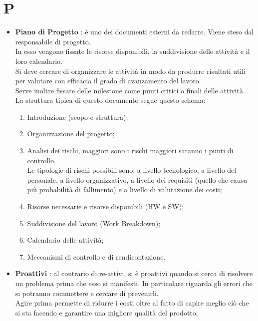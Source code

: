 % 
%
% 
%

\section{P}

\begin{itemize}
	\item \textbf{Piano di Progetto} : è uno dei documenti esterni da redarre. Viene steso dal responsabile di progetto. \\
In esso vengono fissate le risorse disponibili, la suddivisione delle attività e il loro calendario. \\
Si deve cercare di organizzare le attività in modo da produrre risultati utili per valutare con efficacia il grado di avanzamento del lavoro. \\
Serve inoltre fissare delle milestone come punti critici o finali delle attività. \\
La struttura tipica di questo documento segue questo schema:
	\begin{enumerate}
		\item Introduzione (scopo e struttura);
		\item Organizzazione del progetto;
		\item Analisi dei rischi, maggiori sono i rischi maggiori saranno i punti di controllo. \\
Le tipologie di rischi possibili sono: a livello tecnologico, a livello del personale, a livello organizzativo, a livello dei requisiti (quello che causa più probabilità di fallimento) e a livello di valutazione dei costi;
		\item Risorse necessarie e risorse disponibili (HW e SW);
		\item Suddivisione del lavoro (Work Breakdown);
		\item Calendario delle attività;
		\item Meccanismi di controllo e di rendicontazione.
	\end{enumerate}
 

	\item \textbf{Proattivi} : al contrario di re-attivi, si è proattivi quando si cerca di risolvere un problema prima che esso si manifesti. In particolare riguarda gli errori che si potranno commettere e cercare di prevenirli. \\
Agire prima permette di ridurre i costi oltre al fatto di capire meglio ciò che si sta facendo e garantire una migliore qualità del prodotto;


\end{itemize}
